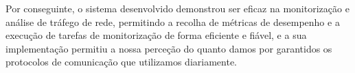 \documentclass[a4paper,12pt]{scrreprt}
\begin{document}
Por conseguinte, o sistema desenvolvido demonstrou ser eficaz na monitorização e
análise de tráfego de rede, permitindo a recolha de métricas de
desempenho e a execução de tarefas de monitorização de forma eficiente e fiável,
e a sua implementação permitiu a nossa perceção do quanto damos por garantidos
os protocolos de comunicação que utilizamos diariamente.





%
%
%
%
%



%

\end{document}
